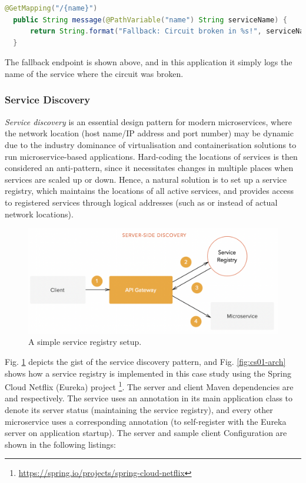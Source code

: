 \begin{lstlisting}[language=Java, caption=Code snippet from \code{FallbackController.java}]
  @GetMapping("/{name}")
  public String message(@PathVariable("name") String serviceName) {
      return String.format("Fallback: Circuit broken in %s!", serviceName);
  }
\end{lstlisting}

The fallback endpoint is shown above, and in this application it simply logs the name of the service where the circuit was broken.

\subsubsection{Service Discovery}

\textit{Service discovery} is an essential design pattern for modern microservices, where the network location (host name/IP address and port number) may be dynamic due to the industry dominance of virtualisation and containerisation solutions to run microservice-based applications. Hard-coding the locations of services is then considered an anti-pattern, since it necessitates changes in multiple places when services are scaled up or down. Hence, a natural solution is to set up a service registry, which maintains the locations of all active services, and provides access to registered services through logical addresses (such as  or  instead of actual network locations).

\begin{figure}[H]
	\centering
	\includegraphics[width=0.7\linewidth]{./assets/images/case-studies/server-side-discovery.png}
	\caption{A simple service registry setup.}
	\label{fig:server-side-discovery}
\end{figure}

Fig. \ref{fig:server-side-discovery} depicts the gist of the service discovery pattern, and Fig. \ref{fig:cs01-arch} shows how a service registry is implemented in this case study using the Spring Cloud Netflix (Eureka) project \footnote{\url{https://spring.io/projects/spring-cloud-netflix}}. The server and client Maven dependencies are  and  respectively. The  service uses an  annotation in its main application class to denote its server status (maintaining the service registry), and every other microservice uses a corresponding  annotation (to self-register with the Eureka server on application startup). The server and sample client Configuration are shown in the following listings:

